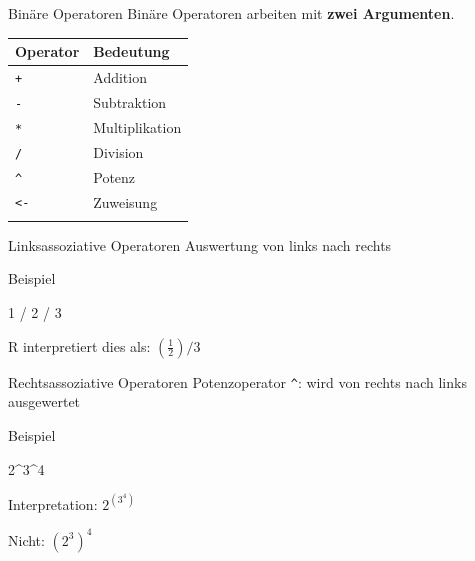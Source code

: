 \documentclass[
  10pt,
  ignorenonframetext,
  aspectratio=169,
]{beamer}
\newenvironment{Shaded}{}{}
\newcommand{\DecValTok}[1]{\textcolor[rgb]{0.25,0.63,0.44}{#1}}
\newcommand{\SpecialCharTok}[1]{\textcolor[rgb]{0.25,0.44,0.63}{#1}}
\begin{document}
\begin{frame}[fragile]{Binäre Operatoren}
\label{binuxe4re-operatoren}
Binäre Operatoren arbeiten mit \textbf{zwei Argumenten}.

\begin{longtable}[]{@{}ll@{}}
\toprule\noalign{}
Operator & Bedeutung \\
\midrule\noalign{}
\endhead
\texttt{+} & Addition \\
\texttt{-} & Subtraktion \\
\texttt{*} & Multiplikation \\
\texttt{/} & Division \\
\texttt{\^{}} & Potenz \\
\texttt{\textless{}-} & Zuweisung \\
\bottomrule\noalign{}
\end{longtable}
\end{frame}

\begin{frame}[fragile]{Linksassoziative Operatoren}
\label{linksassoziative-operatoren}
Auswertung von links nach rechts

Beispiel

\begin{Shaded}
\begin{Highlighting}[]
\DecValTok{1} \SpecialCharTok{/} \DecValTok{2} \SpecialCharTok{/} \DecValTok{3}
\end{Highlighting}
\end{Shaded}

R interpretiert dies als: \(\left(\frac{1}{2}\right)/3\)
\end{frame}

\begin{frame}[fragile]{Rechtsassoziative Operatoren}
\label{rechtsassoziative-operatoren}
Potenzoperator \texttt{\^{}}: wird von rechts nach links ausgewertet

Beispiel

\begin{Shaded}
\begin{Highlighting}[]
\DecValTok{2}\SpecialCharTok{\^{}}\DecValTok{3}\SpecialCharTok{\^{}}\DecValTok{4}
\end{Highlighting}
\end{Shaded}

Interpretation: \(2^{(3^4)}\)

Nicht: \((2^3)^4\)
\end{frame}
\end{document}
